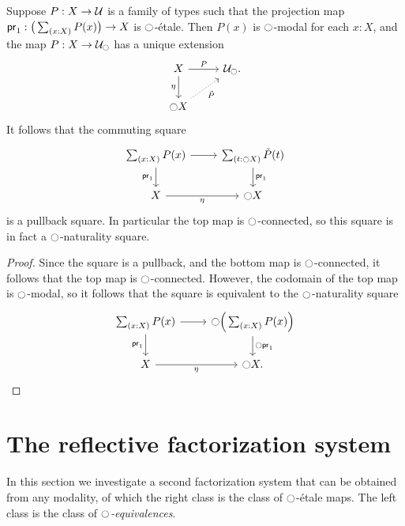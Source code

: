\documentclass[9pt,twosided]{amsart}
\begin{document}
\begin{cor}
Suppose $P:X\to\mathcal{U}$ is a family of types such that the projection map $\proj 1:\big(\sm{x:X}P(x)\big)\to X$ is ${\ocircle}$-\'etale. Then $P(x)$ is ${\ocircle}$-modal for each $x:X$, and the map $P:X\to\mathcal{U}_{\ocircle}$ has a unique extension
\begin{equation*}
\begin{tikzcd}
X \arrow[d,swap,"\modalunit"] \arrow[r,"P"] & \UU_\modal. \\
\modal X \arrow[ur,densely dotted,swap,"\tilde{P}"] 
\end{tikzcd}
\end{equation*}
It follows that the commuting square
\begin{equation*}
\begin{tikzcd}
\sm{x:X}P(x) \arrow[d,swap,"\proj 1"] \arrow[r] & \sm{t:\modal X}\tilde{P}(t) \arrow[d,"\proj 1"] \\
X \arrow[r,swap,"\modalunit"] & \modal X
\end{tikzcd}
\end{equation*}
is a pullback square. In particular the top map is ${\ocircle}$-connected, so this square is in fact a ${\ocircle}$-naturality square.
\end{cor}

\begin{proof}
  Since the square is a pullback, and the bottom map is ${\ocircle}$-connected, it follows that the top map is ${\ocircle}$-connected. However, the codomain of the top map is ${\ocircle}$-modal, so it follows that the square is equivalent to the ${\ocircle}$-naturality square
  \begin{equation*}
    \begin{tikzcd}
      \sm{x:X}P(x) \arrow[d,swap,"\proj 1"] \arrow[r] & \modal\Big(\sm{x:X}P(x)\Big) \arrow[d,"\modal \proj 1"] \\
X \arrow[r,swap,"\modalunit"] & \modal X.
    \end{tikzcd}
  \end{equation*}
\end{proof}

\section{The reflective factorization system}\label{section:reflective-factorization-system}

In this section we investigate a second factorization system that can be obtained from any modality, of which the right class is the class of ${\ocircle}$-\'etale maps. The left class is the class of \emph{${\ocircle}$-equivalences}.
\end{document}
